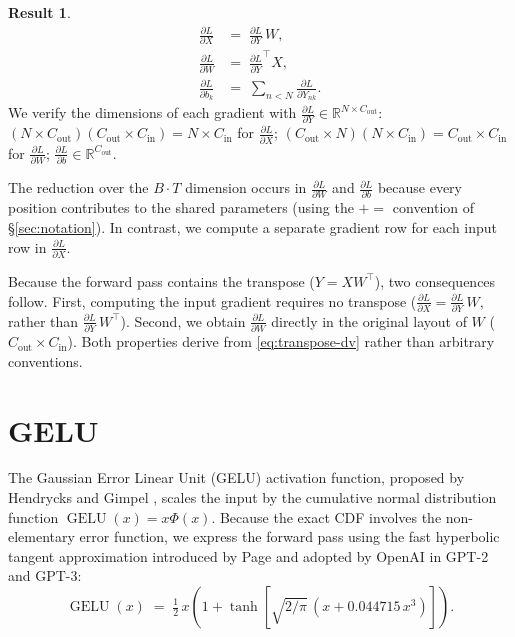 \documentclass[letterpaper, 10 pt, conference]{ieeeconf}
\newcommand{\R}{\mathbb{R}}
\newcommand{\pdv}[2]{\frac{\partial #1}{\partial #2}}
\newcommand{\dL}[1]{\pdv{L}{#1}}
\DeclareMathOperator{\gelu}{GELU}
\theoremstyle{definition}
\newtheorem*{result}{Result}
\begin{document}
\begin{result}
  \begin{align}
    \dL{X}   & =\; \dL{Y}\,W,              \\
    \dL{W}   & =\; \dL{Y}^{\top} X,        \\
    \dL{b_k} & =\; \sum_{n<N} \dL{Y_{nk}}.
    \label{eq:matmul-bwd}
  \end{align}
  We verify the dimensions of each gradient with $\dL{Y} \in \R^{N \times C_{\text{out}}}$:
  $(N \times C_{\text{out}})(C_{\text{out}} \times C_{\text{in}})
    = N \times C_{\text{in}}$ for $\dL{X}$;
  $(C_{\text{out}} \times N)(N \times C_{\text{in}})
    = C_{\text{out}} \times C_{\text{in}}$ for $\dL{W}$;
  $\dL{b} \in \R^{C_{\text{out}}}$.

  The reduction over the $B \cdot T$ dimension occurs in $\dL{W}$ and $\dL{b}$ because every position contributes to the shared parameters (using the $\mathrel{+}=$ convention of \S\ref{sec:notation}). In contrast, we compute a separate gradient row for each input row in $\dL{X}$.

  Because the forward pass contains the transpose ($Y = XW^{\top}$), two consequences follow. First, computing the input gradient requires no transpose ($\dL{X} = \dL{Y}\,W$, rather than $\dL{Y}\,W^{\top}$). Second, we obtain $\dL{W}$ directly in the original layout of $W$ ($C_{\text{out}} \times C_{\text{in}}$). Both properties derive from \eqref{eq:transpose-dv} rather than arbitrary conventions.
\end{result}

\section{GELU}\label{sec:gelu}

The Gaussian Error Linear Unit (GELU) activation function, proposed by Hendrycks and Gimpel \cite{gelu}, scales the input by the cumulative normal distribution function $\gelu(x) = x \Phi(x)$. Because the exact CDF involves the non-elementary error function, we express the forward pass using the fast hyperbolic tangent approximation introduced by Page \cite{page} and adopted by OpenAI in GPT-2~\cite{gpt2} and GPT-3:
\begin{equation}
  \gelu(x) \;=\; \tfrac{1}{2}\,x\left(1 + \tanh\!\left[\sqrt{2/\pi}\,
      (x + 0.044715\,x^{3})\right]\right).
  \label{eq:gelu-fwd}
\end{equation}
\end{document}
